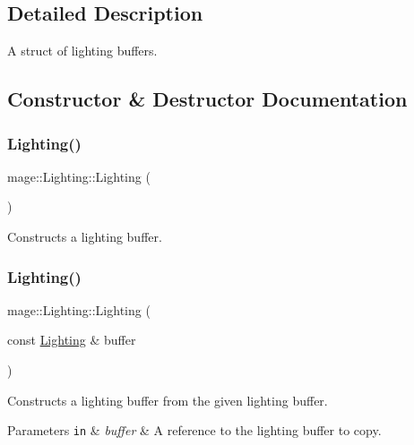 \subsection{Detailed Description}
A struct of lighting buffers. 

\subsection{Constructor \& Destructor Documentation}
\hypertarget{structmage_1_1_lighting_ad20db5afa45811185e31388deeda624b}{}\label{structmage_1_1_lighting_ad20db5afa45811185e31388deeda624b} 
\subsubsection{\texorpdfstring{Lighting()}{Lighting()}\hspace{0.1cm}{\footnotesize\ttfamily [1/3]}}
{\footnotesize\ttfamily mage\+::\+Lighting\+::\+Lighting (\begin{DoxyParamCaption}{ }\end{DoxyParamCaption})}

Constructs a lighting buffer. \hypertarget{structmage_1_1_lighting_ae92175ad94cc88badf2dc4fd93cb2e2f}{}\label{structmage_1_1_lighting_ae92175ad94cc88badf2dc4fd93cb2e2f} 
\subsubsection{\texorpdfstring{Lighting()}{Lighting()}\hspace{0.1cm}{\footnotesize\ttfamily [2/3]}}
{\footnotesize\ttfamily mage\+::\+Lighting\+::\+Lighting (\begin{DoxyParamCaption}\item[{const \hyperlink{structmage_1_1_lighting}{Lighting} \&}]{buffer }\end{DoxyParamCaption})\hspace{0.3cm}{\ttfamily [default]}}

Constructs a lighting buffer from the given lighting buffer.


\begin{DoxyParams}[1]{Parameters}
\mbox{\tt in}  & {\em buffer} & A reference to the lighting buffer to copy. \\
\hline
\end{DoxyParams}
\hypertarget{structmage_1_1_lighting_a03ce177d02db1f7ee2b779aa4cb321c1}{}\label{structmage_1_1_lighting_a03ce177d02db1f7ee2b779aa4cb321c1} 
